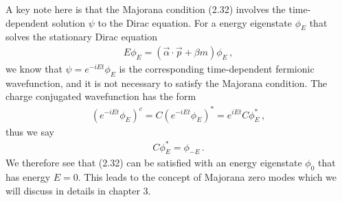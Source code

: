 \documentclass[11pt, oneside]{book}
\theoremstyle{break}
\theoremstyle{break}
\begin{document}
A key note here is that the Majorana condition (2.32) involves the time-dependent solution $\psi$ to the Dirac equation. For a energy eigenstate $\phi_E$ that solves the stationary Dirac equation
\begin{align}
E\phi_E = (\vec{\alpha}\cdot \vec{p} + \beta m ) \phi_E\,,
\end{align}
we know that $\psi = e^{-iEt}\phi_E$ is the corresponding time-dependent fermionic wavefunction, and it is not necessary to satisfy the Majorana condition. The charge conjugated wavefunction has the form
\begin{align}
(e^{-iEt}\phi_E)^c = C(e^{-iEt}\phi_E)^*=e^{iEt}C\phi_E^* \,,
\end{align}
thus we say
\begin{align}
C\phi_{E}^* = \phi_{-E}\,.
\end{align}
We therefore see that (2.32) can be satisfied with an energy eigenstate $\phi_0$ that has energy $E=0$. This leads to the concept of Majorana zero modes which we will discuss in details in chapter 3. 

\end{document}
